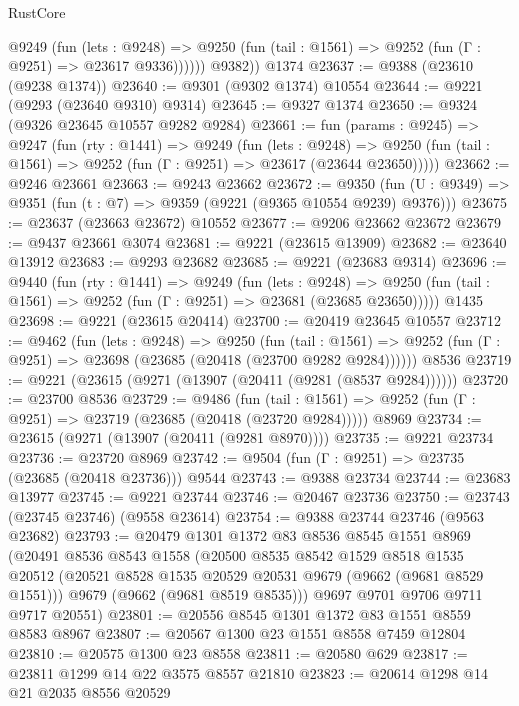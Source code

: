 \begin{lexlean}{RustCore}
\begin{coremodule}
            @9249
              (fun (lets : @9248) =>
              @9250 (fun (tail : @1561) => @9252 (fun (Γ : @9251) => @23617 @9336))))))
        @9382))
    @1374
@23637 := @9388 (@23610 (@9238 @1374))
@23640 := @9301 (@9302 @1374) @10554
@23644 := @9221 (@9293 (@23640 @9310) @9314)
@23645 := @9327 @1374
@23650 := @9324 (@9326 @23645 @10557 @9282 @9284)
@23661 := fun (params : @9245) =>
  @9247
    (fun (rty : @1441) =>
    @9249
      (fun (lets : @9248) =>
      @9250 (fun (tail : @1561) => @9252 (fun (Γ : @9251) => @23617 (@23644 @23650)))))
@23662 := @9246 @23661
@23663 := @9243 @23662
@23672 := @9350
    (fun (U : @9349) => @9351 (fun (t : @7) => @9359 (@9221 (@9365 @10554 @9239) @9376)))
@23675 := @23637 (@23663 @23672) @10552
@23677 := @9206 @23662 @23672
@23679 := @9437 @23661 @3074
@23681 := @9221 (@23615 @13909)
@23682 := @23640 @13912
@23683 := @9293 @23682
@23685 := @9221 (@23683 @9314)
@23696 := @9440
    (fun (rty : @1441) =>
    @9249
      (fun (lets : @9248) =>
      @9250 (fun (tail : @1561) => @9252 (fun (Γ : @9251) => @23681 (@23685 @23650)))))
    @1435
@23698 := @9221 (@23615 @20414)
@23700 := @20419 @23645 @10557
@23712 := @9462
    (fun (lets : @9248) =>
    @9250
      (fun (tail : @1561) =>
      @9252 (fun (Γ : @9251) => @23698 (@23685 (@20418 (@23700 @9282 @9284))))))
    @8536
@23719 := @9221 (@23615 (@9271 (@13907 (@20411 (@9281 (@8537 @9284))))))
@23720 := @23700 @8536
@23729 := @9486
    (fun (tail : @1561) => @9252 (fun (Γ : @9251) => @23719 (@23685 (@20418 (@23720 @9284)))))
    @8969
@23734 := @23615 (@9271 (@13907 (@20411 (@9281 @8970))))
@23735 := @9221 @23734
@23736 := @23720 @8969
@23742 := @9504 (fun (Γ : @9251) => @23735 (@23685 (@20418 @23736))) @9544
@23743 := @9388 @23734
@23744 := @23683 @13977
@23745 := @9221 @23744
@23746 := @20467 @23736
@23750 := @23743 (@23745 @23746) (@9558 @23614)
@23754 := @9388 @23744 @23746 (@9563 @23682)
@23793 := @20479
    @1301
    @1372
    @83
    @8536
    @8545
    @1551
    @8969
    (@20491
      @8536
      @8543
      @1558
      (@20500
        @8535
        @8542
        @1529
        @8518
        @1535
        @20512
        (@20521 @8528 @1535 @20529 @20531 @9679 (@9662 (@9681 @8529 @1551)))
        @9679
        (@9662 (@9681 @8519 @8535)))
      @9697
      @9701
      @9706
      @9711
      @9717
      @20551)
@23801 := @20556 @8545 @1301 @1372 @83 @1551 @8559 @8583 @8967
@23807 := @20567 @1300 @23 @1551 @8558 @7459 @12804
@23810 := @20575 @1300 @23 @8558
@23811 := @20580 @629
@23817 := @23811 @1299 @14 @22 @3575 @8557 @21810
@23823 := @20614 @1298 @14 @21 @2035 @8556 @20529

\end{coremodule}
\end{lexlean}
